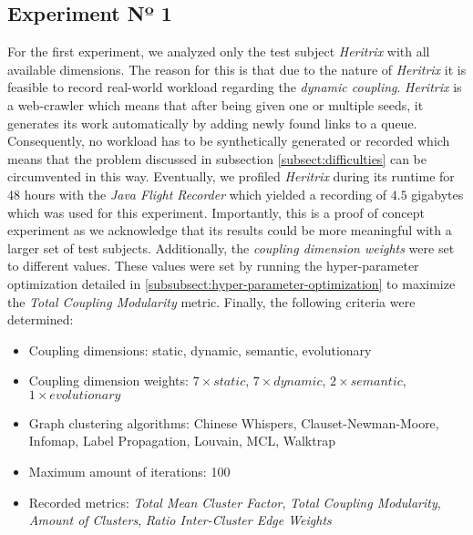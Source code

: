 \documentclass[12pt,a4paper]{report}
\begin{document}
\subsection{Experiment Nº 1}
For the first experiment, we analyzed only the test subject \textit{Heritrix} with
all available dimensions. The reason for this is that due to the nature of
\textit{Heritrix} it is feasible to record real\hyp world workload regarding the
\textit{dynamic coupling}. \textit{Heritrix} is a web\hyp crawler which means that
after being given one or multiple seeds, it generates its work automatically by
adding newly found links to a queue. Consequently, no workload has to be
synthetically generated or recorded which means that the problem discussed in
subsection \ref{subsect:difficulties} can be circumvented in this way.
Eventually, we profiled \textit{Heritrix} during its runtime for 48 hours with the
\textit{Java Flight Recorder} which yielded a recording of $4.5$ gigabytes
which was used for this experiment.
Importantly, this is a proof of concept experiment as we acknowledge that its
results could be more meaningful with a larger set of test subjects.
Additionally, the \textit{coupling dimension weights} were set to different values.
These values were set by running the hyper\hyp parameter optimization detailed in
\ref{subsubsect:hyper-parameter-optimization} to maximize the
\textit{Total Coupling Modularity} metric.
Finally, the following criteria were determined:
\begin{itemize}[noitemsep]
    \item Coupling dimensions: static, dynamic, semantic, evolutionary
    \item Coupling dimension weights: $7 \times static$, $7 \times dynamic$, $2 \times semantic$, $1 \times evolutionary$
    \item Graph clustering algorithms: Chinese Whispers, Clauset-Newman-Moore, Infomap, Label Propagation, Louvain, MCL, Walktrap
    \item Maximum amount of iterations: 100
    \item Recorded metrics:
    \textit{Total Mean Cluster Factor},
    \textit{Total Coupling Modularity},
    \textit{Amount of Clusters},
    \textit{Ratio Inter-Cluster Edge Weights}
\end{itemize}
\end{document}
